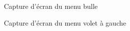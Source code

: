 \begin{figure}[H]
    \label{fig-menu-bulle}
    \noindent{}
    \caption{Capture d'écran du menu bulle}
\end{figure}

\begin{figure}[H]
    \label{fig-menu-lateral}
    \noindent{}
    \caption{Capture d'écran du menu volet à gauche}
\end{figure}

